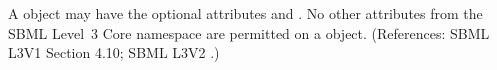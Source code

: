 A \Constraint object may have the optional attributes   and
.  No other attributes from the SBML Level~3 Core namespace
are permitted on a \Constraint object.  (References: SBML L3V1 Section 4.10; SBML L3V2
.)
